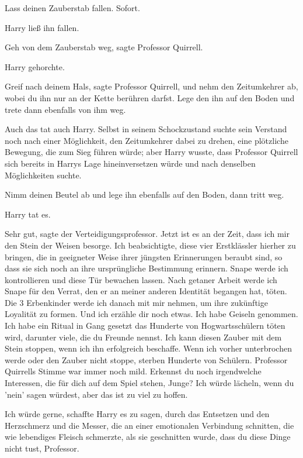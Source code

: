 \glqq{}Lass deinen Zauberstab fallen. Sofort.\grqq{}

Harry ließ ihn fallen.

\glqq{}Geh von dem Zauberstab weg\grqq{}, sagte Professor Quirrell.

Harry gehorchte.

\glqq{}Greif nach deinem Hals\grqq{}, sagte Professor Quirrell, \glqq{}und nehm
den Zeitumkehrer ab, wobei du ihn nur an der Kette berühren darfst. Lege den ihn
auf den Boden und trete dann ebenfalls von ihm weg.\grqq{}

Auch das tat auch Harry. Selbst in seinem Schockzustand suchte sein Verstand
noch nach einer Möglichkeit, den Zeitumkehrer dabei zu drehen, eine plötzliche
Bewegung, die zum Sieg führen würde; aber Harry wusste, dass Professor Quirrell
sich bereits in Harrys Lage hineinversetzen würde und nach denselben
Möglichkeiten suchte.

\glqq{}Nimm deinen Beutel ab und lege ihn ebenfalls auf den Boden, dann tritt
weg.\grqq{}

Harry tat es.

\glqq{}Sehr gut\grqq{}, sagte der Verteidigungsprofessor. \glqq{}Jetzt ist es an
der Zeit, dass ich mir den Stein der Weisen besorge. Ich beabsichtigte, diese
vier Erstklässler hierher zu bringen, die in geeigneter Weise ihrer jüngsten
Erinnerungen beraubt sind, so dass sie sich noch an ihre ursprüngliche
Bestimmung erinnern. Snape werde ich kontrollieren und diese Tür bewachen
lassen. Nach getaner Arbeit werde ich Snape für den Verrat, den er an meiner
anderen Identität begangen hat, töten. Die 3 Erbenkinder werde ich danach mit
mir nehmen, um ihre zukünftige Loyalität zu formen. Und ich erzähle dir noch
etwas. Ich habe Geiseln genommen. Ich habe ein Ritual in Gang gesetzt das
Hunderte von Hogwartsschülern töten wird, darunter viele, die du Freunde nennst.
Ich kann diesen Zauber mit dem Stein stoppen, wenn ich ihn erfolgreich
beschaffe. Wenn ich vorher unterbrochen werde oder den Zauber nicht stoppe,
sterben Hunderte von Schülern.\grqq{} Professor Quirrells Stimme war immer noch mild.
\glqq{}Erkennst du noch irgendwelche Interessen, die für dich auf dem Spiel
stehen, Junge? Ich würde lächeln, wenn du 'nein' sagen würdest, aber das ist zu
viel zu hoffen.\grqq{}

\glqq{}Ich würde gerne\grqq{}, schaffte Harry es zu sagen, durch das Entsetzen
und den Herzschmerz und die Messer, die an einer emotionalen Verbindung
schnitten, die wie lebendiges Fleisch schmerzte, als sie geschnitten wurde,
\glqq{}dass du diese Dinge nicht tust, Professor.\grqq{}

